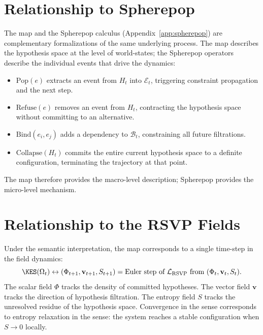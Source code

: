 \section{Relationship to Spherepop}

The \KES map and the Spherepop calculus (Appendix~\ref{app:spherepop}) are
complementary formalizations of the same underlying process. The \KES map
describes the hypothesis space at the level of world-states; the Spherepop
operators describe the individual events that drive the \KES dynamics:

\begin{itemize}
  \item $\mathrm{Pop}(e)$ extracts an event from $H_t$ into $\mathcal{E}_t$,
    triggering constraint propagation and the next \KES step.
  \item $\mathrm{Refuse}(e)$ removes an event from $H_t$, contracting the
    hypothesis space without committing to an alternative.
  \item $\mathrm{Bind}(e_i, e_j)$ adds a dependency to $\mathcal{B}_t$,
    constraining all future filtrations.
  \item $\mathrm{Collapse}(H_t)$ commits the entire current hypothesis space
    to a definite configuration, terminating the \KES trajectory at that point.
\end{itemize}

The \KES map therefore provides the macro-level description; Spherepop provides
the micro-level mechanism.

\section{Relationship to the RSVP Fields}

Under the semantic interpretation, the \KES map corresponds to a single
time-step in the \RSVP field dynamics:
\[
  \KES(\Omega_t) \leftrightarrow
  (\Phi_{t+1}, \mathbf{v}_{t+1}, S_{t+1})
  = \text{Euler step of } \mathcal{L}_{\rm RSVP} \text{ from }
  (\Phi_t, \mathbf{v}_t, S_t).
\]
The scalar field $\Phi$ tracks the density of committed hypotheses. The vector
field $\mathbf{v}$ tracks the direction of hypothesis filtration. The entropy
field $S$ tracks the unresolved residue of the hypothesis space. Convergence
in the \KES sense corresponds to entropy relaxation in the \RSVP sense: the
system reaches a stable configuration when $S \to 0$ locally.
